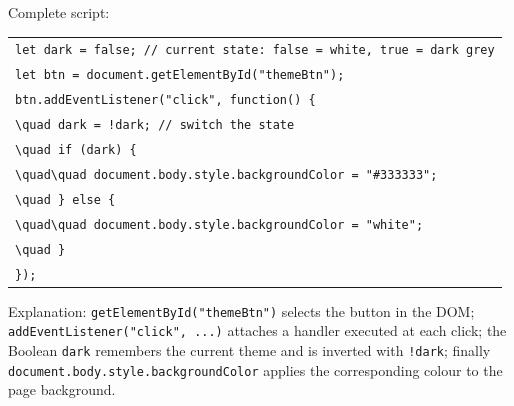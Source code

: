 \documentclass[11pt]{article}
\begin{document}
\begin{corrige}
Complete script:
\begin{center}
\begin{tabular}{l}
\texttt{let dark = false; // current state: false = white, true = dark grey}\\
\texttt{let btn = document.getElementById("themeBtn");}\\
\texttt{btn.addEventListener("click", function() \{}\\
\texttt{\textbackslash{}quad dark = !dark; // switch the state}\\
\texttt{\textbackslash{}quad if (dark) \{}\\
\texttt{\textbackslash{}quad\textbackslash{}quad document.body.style.backgroundColor = "\#333333";}\\
\texttt{\textbackslash{}quad \} else \{}\\
\texttt{\textbackslash{}quad\textbackslash{}quad document.body.style.backgroundColor = "white";}\\
\texttt{\textbackslash{}quad \}}\\
\texttt{\});}
\end{tabular}
\end{center}
Explanation: \texttt{getElementById("themeBtn")} selects the button in the DOM; \texttt{addEventListener("click", ...)} attaches a handler executed at each click; the Boolean \texttt{dark} remembers the current theme and is inverted with \texttt{!dark}; finally \texttt{document.body.style.backgroundColor} applies the corresponding colour to the page background.
\end{corrige}
\end{document}

